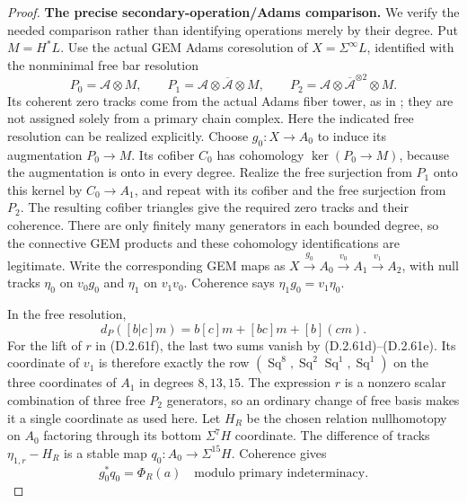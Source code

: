 \begin{proof}
\medskip\noindent
\textbf{The precise secondary-operation/Adams comparison.}
We verify the needed comparison rather than identifying
operations merely by their degree.  Put $M=H^*L$.
Use the actual GEM Adams coresolution of
$X=\Sigma^\infty L$, identified with the nonminimal
free bar resolution
\[
 P_0=\mathcal A\otimes M,\qquad
 P_1=\mathcal A\otimes\overline{\mathcal A}\otimes M,
 \qquad
 P_2=\mathcal A\otimes\overline{\mathcal A}^{\otimes2}
                                                   \otimes M.
 \tag{D.2.61r}
\]
Its coherent zero tracks come from the actual Adams
fiber tower, as in
\cite[Theorem~6.9 and Section~7]{EH5BauesJibladze2004};
they are not assigned solely from a primary chain complex.
Here the indicated free resolution can be realized explicitly.
Choose $g_0:X\to A_0$ to induce its augmentation
$P_0\to M$.  Its cofiber $C_0$ has cohomology
$\ker(P_0\to M)$, because the augmentation is onto
in every degree.  Realize the free surjection from $P_1$
onto this kernel by $C_0\to A_1$, and repeat with its
cofiber and the free surjection from $P_2$.
The resulting cofiber triangles give the required zero
tracks and their coherence.  There are only finitely many
generators in each bounded degree, so the connective GEM
products and these cohomology identifications are legitimate.
Write the corresponding GEM maps as
$X\xrightarrow{g_0}A_0\xrightarrow{v_0}A_1
\xrightarrow{v_1}A_2$, with null tracks
$\eta_0$ on $v_0g_0$ and $\eta_1$ on $v_1v_0$.
Coherence says $\eta_1g_0=v_1\eta_0$.

In the free resolution,
\[
 d_P([b|c]m)=b[c]m+[bc]m+[b](cm).
 \tag{D.2.61s}
\]
For the lift of $r$ in \textup{(D.2.61f)}, the last
two sums vanish by \textup{(D.2.61d)--(D.2.61e)}.
Its coordinate of $v_1$ is therefore exactly the row
$(\operatorname{Sq}^8,
\operatorname{Sq}^2\operatorname{Sq}^1,
\operatorname{Sq}^1)$ on the three coordinates of $A_1$
in degrees $8,13,15$.
The expression $r$ is a nonzero scalar combination of
three free $P_2$ generators, so an ordinary change of
free basis makes it a single coordinate as used here.
Let $H_R$ be the chosen relation nullhomotopy on $A_0$
factoring through its bottom $\Sigma^7H$ coordinate.
The difference of tracks
$\eta_{1,r}-H_R$ is a stable map
$q_0:A_0\to\Sigma^{15}H$.
Coherence gives
\[
                       g_0^*q_0=\Phi_R(a)
                         \quad\text{modulo primary indeterminacy}.
                       \tag{D.2.61t}
\]


\end{proof}
